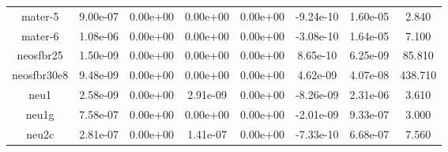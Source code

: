 {{\begin{table}[h]
\begin{center}
{\begin{tabular}{cccccccc}
             mater-5 & 9.00e-07 & 0.00e+00 & 0.00e+00 & 0.00e+00 & -9.24e-10 & 1.60e-05 & 2.840 \\ 
             mater-6 & 1.08e-06 & 0.00e+00 & 0.00e+00 & 0.00e+00 & -3.08e-10 & 1.64e-05 & 7.100 \\ 
           neosfbr25 & 1.50e-09 & 0.00e+00 & 0.00e+00 & 0.00e+00 & 8.65e-10 & 6.25e-09 & 85.810 \\ 
         neosfbr30e8 & 9.48e-09 & 0.00e+00 & 0.00e+00 & 0.00e+00 & 4.62e-09 & 4.07e-08 & 438.710 \\ 
                neu1 & 2.58e-09 & 0.00e+00 & 2.91e-09 & 0.00e+00 & -8.26e-09 & 2.31e-06 & 3.610 \\ 
               neu1g & 7.58e-07 & 0.00e+00 & 0.00e+00 & 0.00e+00 & -2.01e-09 & 9.33e-07 & 3.000 \\ 
               neu2c & 2.81e-07 & 0.00e+00 & 1.41e-07 & 0.00e+00 & -7.33e-10 & 6.68e-07 & 7.560 \\    
               \bottomrule
    \end{tabular}
  }  
\end{center}
\end{table}}}

